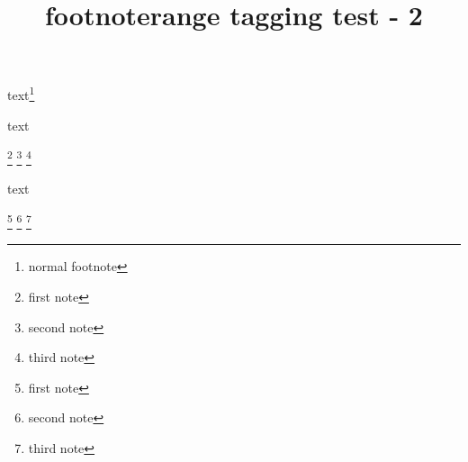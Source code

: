 \documentclass{article}
\title{footnoterange tagging test - 2}
\begin{document}
text\footnote{normal footnote}

text
\begin{footnoterange}
\footnote{first note}%
\footnote{second note}%
\footnote{third note}%
\end{footnoterange}

text
\begin{footnoterange*}
\footnote{first note}%
\footnote{second note}%
\footnote{third note}%
\end{footnoterange*}
\end{document}
